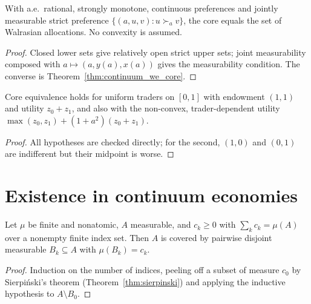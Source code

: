 \begin{corollary}
\label{cor:aumann_equivalence}
\leanok
{}
With a.e.\ rational, strongly monotone, continuous preferences and jointly measurable strict preference
$\{(a,u,v) : u \succ_a v\}$, the core equals the set of Walrasian allocations. No convexity is assumed.
\end{corollary}
\begin{proof}
\leanok
Closed lower sets give relatively open strict upper sets; joint measurability composed with $a \mapsto (a, y(a), x(a))$
gives the measurability condition. The converse is Theorem~\ref{thm:continuum_we_core}.
\end{proof}

\begin{theorem}[Witnesses]
\label{thm:aumann_witness}
\leanok
{}
Core equivalence holds for uniform traders on $[0,1]$ with endowment $(1,1)$ and utility $z_0 + z_1$, and also with the
non-convex, trader-dependent utility $\max(z_0, z_1) + (1 + a^2)(z_0 + z_1)$.
\end{theorem}
\begin{proof}
\leanok
All hypotheses are checked directly; for the second, $(1,0)$ and $(0,1)$ are indifferent but their midpoint is worse.
\end{proof}

\section{Existence in continuum economies}
\label{sec:continuum_existence}

\begin{lemma}
\label{lem:split_masses}
\leanok
{}
Let $\mu$ be finite and nonatomic, $A$ measurable, and $c_k \ge 0$ with $\sum_k c_k = \mu(A)$ over a nonempty finite index
set. Then $A$ is covered by pairwise disjoint measurable $B_k \subseteq A$ with $\mu(B_k) = c_k$.
\end{lemma}
\begin{proof}
\leanok
Induction on the number of indices, peeling off a subset of measure $c_0$ by Sierpi\'nski's theorem
(Theorem~\ref{thm:sierpinski}) and applying the inductive hypothesis to $A \setminus B_0$.
\end{proof}

